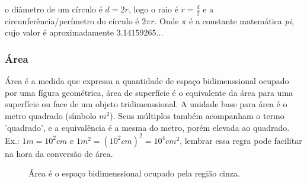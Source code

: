 \begin{multicols*}{2}
    o diâmetro de um círculo é $d = 2r$, logo o raio é $r = \frac{d}{2}$ e a circunferência/perímetro do círculo é $2\pi r$.
    Onde $\pi$ é a constante matemática \textit{pi}, cujo valor é aproximadamente $3.14159265...$


    \subsubsection{Área}
    Área é a medida que expressa a quantidade de espaço bidimenssional ocupado por uma fígura geométrica,
    área de superfície é o equivalente da área para uma superfície ou face de um objeto tridimenssional. A unidade base
    para área é o metro quadrado (símbolo ${m^2}$). Seus múltiplos também acompanham o termo 'quadrado',
    e a equivalência é a mesma do metro, porém elevada ao quadrado. Ex.: $1m = 10^2cm$ e $1m^2 = (10^2cm)^2 = 10^4cm^2$,
    lembrar essa regra pode facilitar na hora da conversão de área.

    \begin{figure}[H]
        \centering
        \caption{Área é o espaço bidimenssional ocupado pela região cinza.}
        \label{fig:tri_abc}
    \end{figure}


\end{multicols*}
